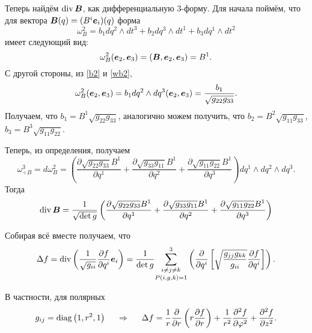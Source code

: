 Теперь найдём $\mathop{\mathrm{div}}\nolimits \mbox{\boldmath $B$}$, как дифференциальную 3-форму. Для начала поймём, что для вектора $\mbox{\boldmath $B$} (q) = (B^i \mbox{\boldmath $e$}_i) (q)$ форма
\begin{equation}
\label{wb2}
    \omega^2_{B} = b_1 dq^2 \wedge dt^3 + b_2 dq^3 \wedge dt^1 + b_3 dq^1 \wedge dt^2
\end{equation}
имеет следующий вид:
$$
    \omega^2_B (\mbox{\boldmath $e$}_2, \mbox{\boldmath $e$}_3) = (\mbox{\boldmath $B$}, \mbox{\boldmath $e$}_2, \mbox{\boldmath $e$}_3) = B^1.
$$
С другой стороны, из \eqref{b2} и \eqref{wb2},
$$
    \omega^2_B (\mbox{\boldmath $e$}_2, \mbox{\boldmath $e$}_3) =
    b_1 dq^2 \wedge dq^3 (\mbox{\boldmath $e$}_2, \mbox{\boldmath $e$}_3) = \frac{b_1}{\sqrt{g_{22} g_{33}}}.
$$
Получаем, что $b_1 = B^1 \sqrt{g_{22} g_{33}}$, аналогично можем получить, что
$b_2 = B^2 \sqrt{g_{11} g_{33}}$, $b_3 = B^3 \sqrt{g_{11} g_{22}}$.

Теперь, из определения, получаем
$$
    \omega^3_{\div B} = d \omega^2_B = 
    \left(
    \frac{\partial \sqrt{g_{22} g_{33}} B^1}{\partial q^1} +
    \frac{\partial \sqrt{g_{33} g_{11}} B^1}{\partial q^2} +
    \frac{\partial \sqrt{g_{11} g_{22}} B^1}{\partial q^3}
    \right)
    dq^1 \wedge dq^2 \wedge dq^3.
$$
Тогда
\begin{equation}
    \mathop{\mathrm{div}}\nolimits \mbox{\boldmath $B$} = \frac{1}{\sqrt{\det g}} 
    \left(
        \frac{\partial \sqrt{g_{22} g_{33}} B^1}{\partial q^1} +
        \frac{\partial \sqrt{g_{33} g_{11}} B^1}{\partial q^2} +
        \frac{\partial \sqrt{g_{11} g_{22}} B^1}{\partial q^3} 
    \right)
\end{equation}

Собирая всё вместе получаем, что
\begin{equation}
    \Delta f = \mathop{\mathrm{div}}\nolimits
    \left(
        \frac{1}{\sqrt{g_{ii}}}  \frac{\partial f}{\partial q^i} \mbox{\boldmath $e$}_i
    \right) =
    \frac{1}{\det g} 
    \underset{P(i,g,k)=1}{\sum_{i \neq j \neq k}^3}
    \left(
        \frac{\partial }{\partial q^i} \left[
            \sqrt{\frac{g_{jj} g_{kk}}{g_{ii}} } \frac{\partial f}{\partial q^i} 
        \right] 
    \right).
\end{equation}

В частности, для полярных
$$
    g_{ij} = \mathop{\mathrm{diag}}\nolimits\left(1, r^2, 1\right)
    \hspace{0.5cm} \Rightarrow \hspace{0.5cm} 
        \Delta f = \frac{1}{r} \frac{\partial }{\partial r} 
    \left(r \frac{\partial f}{\partial r} \right) +
    \frac{1}{r^2} \frac{\partial^2 f}{\partial \varphi^2}  + \frac{\partial^2 f}{\partial z^2} .
$$
